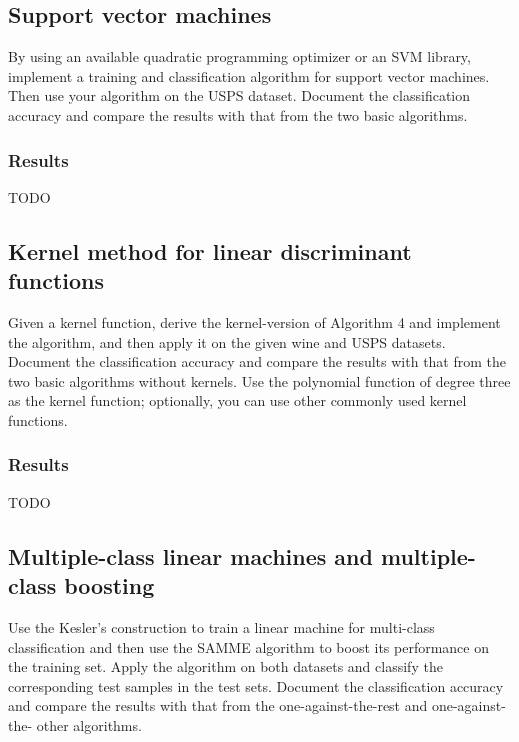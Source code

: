\documentclass{article}
\begin{document}
\subsection{Support vector machines}
By using an available quadratic programming optimizer or an SVM library, implement a training and classification algorithm for support vector machines. Then use your algorithm on the USPS dataset. Document the classification accuracy and compare the results with that from the two basic algorithms.

\subsubsection*{Results}
{\large TODO}


\subsection{Kernel method for linear discriminant functions}
Given a kernel function, derive the kernel-version of Algorithm 4 and implement the algorithm, and then apply it on the given wine and USPS datasets. Document the classification accuracy and compare the results with that from the two basic algorithms without kernels. Use the polynomial function of degree three as the kernel function; optionally, you can use other commonly used kernel functions.

\subsubsection*{Results}
{\large TODO}



\subsection{Multiple-class linear machines and multiple-class boosting}
Use the Kesler’s construction to train a linear machine for multi-class classification and then use the SAMME algorithm to boost its performance on the training set. Apply the algorithm on both datasets and classify the corresponding test samples in the test sets. Document the classification accuracy and compare the results with that from the one-against-the-rest and one-against-the- other algorithms.
\end{document}
